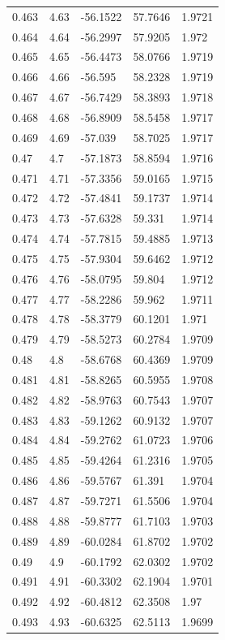 \begin{tabular}{lllll}
0.463 & 4.63 & -56.1522 & 57.7646 & 1.9721 \\
0.464 & 4.64 & -56.2997 & 57.9205 & 1.972 \\
0.465 & 4.65 & -56.4473 & 58.0766 & 1.9719 \\
0.466 & 4.66 & -56.595 & 58.2328 & 1.9719 \\
0.467 & 4.67 & -56.7429 & 58.3893 & 1.9718 \\
0.468 & 4.68 & -56.8909 & 58.5458 & 1.9717 \\
0.469 & 4.69 & -57.039 & 58.7025 & 1.9717 \\
0.47 & 4.7 & -57.1873 & 58.8594 & 1.9716 \\
0.471 & 4.71 & -57.3356 & 59.0165 & 1.9715 \\
0.472 & 4.72 & -57.4841 & 59.1737 & 1.9714 \\
0.473 & 4.73 & -57.6328 & 59.331 & 1.9714 \\
0.474 & 4.74 & -57.7815 & 59.4885 & 1.9713 \\
0.475 & 4.75 & -57.9304 & 59.6462 & 1.9712 \\
0.476 & 4.76 & -58.0795 & 59.804 & 1.9712 \\
0.477 & 4.77 & -58.2286 & 59.962 & 1.9711 \\
0.478 & 4.78 & -58.3779 & 60.1201 & 1.971 \\
0.479 & 4.79 & -58.5273 & 60.2784 & 1.9709 \\
0.48 & 4.8 & -58.6768 & 60.4369 & 1.9709 \\
0.481 & 4.81 & -58.8265 & 60.5955 & 1.9708 \\
0.482 & 4.82 & -58.9763 & 60.7543 & 1.9707 \\
0.483 & 4.83 & -59.1262 & 60.9132 & 1.9707 \\
0.484 & 4.84 & -59.2762 & 61.0723 & 1.9706 \\
0.485 & 4.85 & -59.4264 & 61.2316 & 1.9705 \\
0.486 & 4.86 & -59.5767 & 61.391 & 1.9704 \\
0.487 & 4.87 & -59.7271 & 61.5506 & 1.9704 \\
0.488 & 4.88 & -59.8777 & 61.7103 & 1.9703 \\
0.489 & 4.89 & -60.0284 & 61.8702 & 1.9702 \\
0.49 & 4.9 & -60.1792 & 62.0302 & 1.9702 \\
0.491 & 4.91 & -60.3302 & 62.1904 & 1.9701 \\
0.492 & 4.92 & -60.4812 & 62.3508 & 1.97 \\
0.493 & 4.93 & -60.6325 & 62.5113 & 1.9699 \\

\end{tabular}

